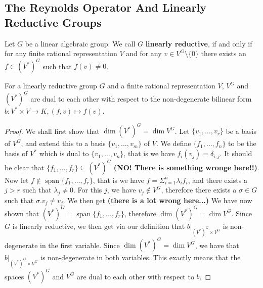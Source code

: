 \subsection{The Reynolds Operator And Linearly Reductive Groups}

\begin{definition}
  Let $G$ be a linear algebraic group.
  We call $G$ \textbf{linearly reductive}, if and only if for any finite rational representation $V$ and for any $v \in V^G \setminus \{ 0 \}$ there exists an $f \in \left( V^\ast \right)^G $ such that $f(v) \neq 0$.
\end{definition}

\begin{proposition}\label{dual}
  For a linearly reductive group $G$ and a finite rational representation $V$, $V^G$ and $(V^\ast)^G$ are dual to each other with respect to the non-degenerate bilinear form $ b\colon V^\ast \times V \longrightarrow K, (f,v) \mapsto f(v)$.
\end{proposition}

\begin{proof}
  We shall first show that $\operatorname{dim}(V^\ast)^G = \operatorname{dim}V^G$.
  Let $\{v_1, \ldots , v_r \}$ be a basis of $V^G$, and extend this to a basis $\{v_1, \ldots , v_m \}$ of $V$.
  We define $\{ f_1 , \ldots , f_n \}$ to be the basis of $V^\ast$ which is dual to $\{v_1, \ldots , v_n \}$, that is we have $ f_i (v_j) = \delta_{i,j} $.
  It should be clear that $\{f_1, \ldots , f_r \} \subseteq (V^\ast)^G$ \textbf{(NO! There is something wronge here!!)}.
  Now let $f \notin \operatorname{span} \{ f_1, \ldots, f_r\}$, that is we have $f = \Sigma_{i=1}^n \lambda_i f_i $, and there exists a $j > r$ such that $ \lambda_j \neq 0$.
  For this $j$, we have $v_j \notin V^G$, therefore there exists a $\sigma \in G$ such that $\sigma . v_j \neq v_j$.
  We then get \textbf{(there is a lot wrong here...)}
  We have now shown that $(V^\ast)^G = \operatorname{span}\{f_1,\dots,f_r\}$, therefore $\operatorname{dim}(V^\ast)^G = \operatorname{dim}V^G$.
  Since $G$ is linearly reductive, we then get via our definition that $\left. b \right|_{(V^\ast)^G \times V^G}$ is non-degenerate in the first variable.
  Since $\operatorname{dim}(V^\ast)^G = \operatorname{dim}V^G$, we have that $\left. b \right|_{(V^\ast)^G \times V^G}$ is non-degenerate in both variables.
  This exactly means that the spaces $(V^\ast)^G$ and $V^G$ are dual to each other with respect to $b$.
\end{proof}

